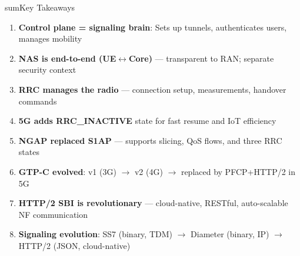 
\begin{CNbox}[unbreakable]{sum}{Key Takeaways}

\begin{enumerate}
\def\labelenumi{\arabic{enumi}.}
\tightlist
\item
  \textbf{Control plane = signaling brain}: Sets up tunnels, authenticates users, manages mobility
\item
  \textbf{NAS is end-to-end (UE\ensuremath{\leftrightarrow}Core)} — transparent to RAN; separate security context
\item
  \textbf{RRC manages the radio} — connection setup, measurements, handover commands
\item
  \textbf{5G adds RRC\_\allowbreak{}INACTIVE} state for fast resume and IoT efficiency
\item
  \textbf{NGAP replaced S1AP} — supports slicing, QoS flows, and three RRC states
\item
  \textbf{GTP-C evolved}: v1 (3G) \ensuremath{\to} v2 (4G) \ensuremath{\to} replaced by PFCP+HTTP/\allowbreak{}2 in 5G
\item
  \textbf{HTTP/\allowbreak{}2 SBI is revolutionary} — cloud-native, RESTful, auto-scalable NF communication
\item
  \textbf{Signaling evolution}: SS7 (binary, TDM) \ensuremath{\to} Diameter (binary, IP) \ensuremath{\to} HTTP/\allowbreak{}2 (JSON, cloud-native)
\end{enumerate}

\end{CNbox}
